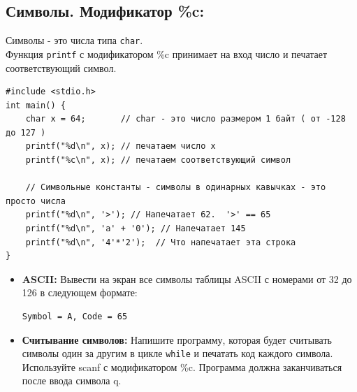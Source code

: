 \documentclass{article}
\begin{document}
\subsection{Символы. Модификатор \%c:}
Символы - это числа типа \texttt{char}.\\
Функция \texttt{printf} с модификатором \%c принимает на вход число и печатает соответствующий символ.
\begin{lstlisting}
#include <stdio.h>
int main() {
	char x = 64;       // char - это число размером 1 байт ( от -128 до 127 )
	printf("%d\n", x); // печатаем число x
	printf("%c\n", x); // печатаем соответствующий символ
	
	// Символьные константы - символы в одинарных кавычках - это просто числа
	printf("%d\n", '>'); // Напечатает 62.  '>' == 65
	printf("%d\n", 'a' + '0'); // Напечатает 145
	printf("%d\n", '4'*'2');  // Что напечатает эта строка
}
\end{lstlisting}

\begin{itemize}
\item \textbf{ASCII:} Вывести на экран все символы таблицы ASCII с номерами от 32 до 126 в следующем формате: 
\begin{lstlisting}
Symbol = A, Code = 65
\end{lstlisting}
\item \textbf{Считывание символов:} Напишите программу, которая будет считывать символы один за другим в цикле \texttt{while} и печатать код каждого символа. Используйте scanf с модификатором \%c. Программа должна заканчиваться после ввода символа q.
\end{itemize}
\end{document}

